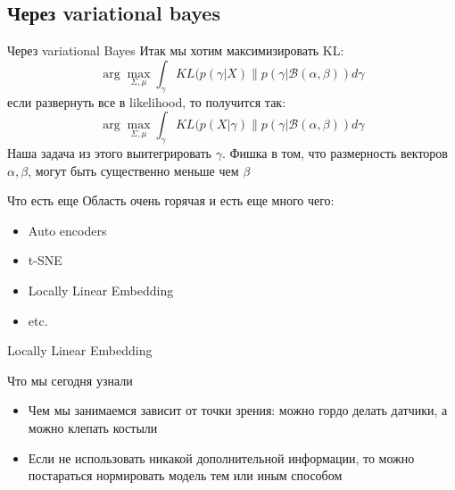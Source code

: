 \documentclass[14pt, fleqn, xcolor={dvipsnames, table}]{beamer}
\begin{document}
\subsection{Через variational bayes}
\begin{frame}{Через variational Bayes}
Итак мы хотим максимизировать KL:
$$
\arg \max_{\Sigma,\mu} \int_\gamma KL(p(\gamma | X) \| p(\gamma | \mathcal{B}(\alpha, \beta)) d\gamma
$$
если развернуть все в likelihood, то получится так:
$$
\arg \max_{\Sigma,\mu} \int_\gamma KL(p(X|\gamma) \| p(\gamma | \mathcal{B}(\alpha, \beta)) d\gamma
$$
Наша задача из этого выитегрировать $\gamma$. Фишка в том, что размерность векторов $\alpha, \beta$, могут быть существенно меньше чем $\beta$
\end{frame}

\begin{frame}{Что есть еще}
Область очень горячая и есть еще много чего:
\begin{itemize}
  \item Auto encoders
  \item t-SNE
  \item Locally Linear Embedding
  \item etc.
\end{itemize}
\end{frame}

\begin{frame}{Locally Linear Embedding}
\end{frame}

\begin{frame}{Что мы сегодня узнали}
\begin{itemize}
  \item Чем мы занимаемся зависит от точки зрения: можно гордо делать датчики, а можно клепать костыли
  \item Если не использовать никакой дополнительной информации, то можно постараться нормировать модель тем или иным способом
\end{itemize}
\end{frame}
\end{document}
